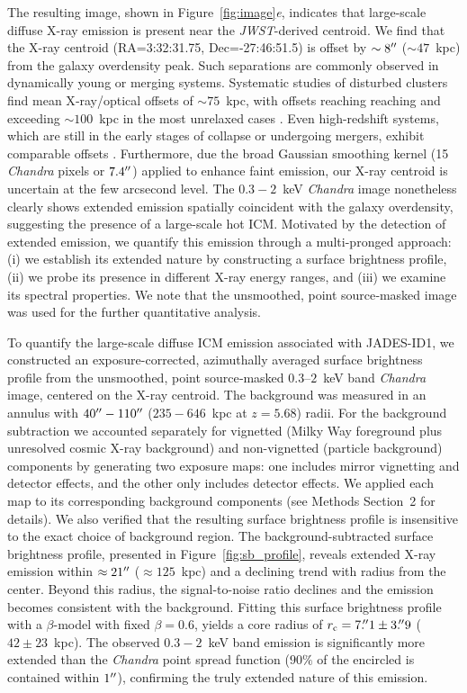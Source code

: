 \documentclass[pdflatex,sn-mathphys-num]{sn-jnl}
\newcommand{\arcsec}{\mbox{\ensuremath{^{\prime\prime}}}}
\theoremstyle{thmstyleone}
\theoremstyle{thmstyletwo}
\theoremstyle{thmstylethree}
\begin{document}
The resulting image, shown in Figure~\ref{fig:image}{\it e}, indicates that large-scale diffuse X-ray emission is present near the \textit{JWST}-derived centroid. We find that the X-ray centroid (RA=3:32:31.75, Dec=-27:46:51.5) is offset by $\sim8\arcsec$ ($\sim47$~kpc) from the galaxy overdensity peak. Such separations are commonly observed in dynamically young or merging systems. Systematic studies of disturbed clusters find mean X‐ray/optical offsets of $\sim75$~kpc, with offsets reaching reaching and exceeding $\sim100$~kpc in the most unrelaxed cases \cite{2012MNRAS.420.2120M,2016MNRAS.457.4515R,2023A&A...671A..57S}. Even high-redshift systems, which are still in the early stages of collapse or undergoing mergers, exhibit comparable offsets \cite{2016ApJ...817..122B,2023Natur.615..809D}. Furthermore, due the broad Gaussian smoothing kernel (15 \textit{Chandra} pixels or $7.4\arcsec$) applied to enhance faint emission, our X-ray centroid is uncertain at the few arcsecond level. The $0.3-2$~keV \textit{Chandra} image nonetheless clearly shows extended emission spatially coincident with the galaxy overdensity, suggesting the presence of a large-scale hot ICM. Motivated by the detection of extended emission, we quantify this emission through a multi-pronged approach: (i) we establish its extended nature by constructing a surface brightness profile, (ii) we probe its presence in different X-ray energy ranges, and (iii) we examine its spectral properties. We note that the unsmoothed, point source‐masked image was  used for the further quantitative analysis.

To quantify the large-scale diffuse ICM emission associated with JADES-ID1, we constructed an exposure-corrected, azimuthally averaged surface brightness profile from the unsmoothed, point source‐masked $0.3–2$~keV band \textit{Chandra} image, centered on the X-ray centroid. The background was measured in an annulus with $40\arcsec-110\arcsec$ ($235-646$~kpc at $z=5.68$) radii. For the background subtraction we accounted separately for vignetted (Milky Way foreground plus unresolved cosmic X-ray background) and non-vignetted (particle background) components by generating two exposure maps: one includes mirror vignetting and detector effects, and the other only includes detector effects. We applied each map to its corresponding background components (see Methods Section~2 for details). We also verified that the resulting surface brightness profile is insensitive to the exact choice of background region. The background-subtracted surface brightness profile, presented in Figure~\ref{fig:sb_profile}, reveals extended X-ray emission within $\approx21\arcsec$ ($\approx125$~kpc) and a declining trend with radius from the center. Beyond this radius, the signal-to-noise ratio declines and the emission becomes consistent with the background. Fitting this surface brightness profile with a $\beta$-model with fixed $\beta=0.6$, yields a core radius of $r_{\rm{c}} = 7.\!\arcsec1 \pm 3.\!\arcsec9$ ($42\pm23$~kpc). The observed $0.3-2$~keV band emission is significantly more extended than the \textit{Chandra} point spread function ($90\%$ of the encircled is contained within $1\arcsec$), confirming the truly extended nature of this emission.
\end{document}
